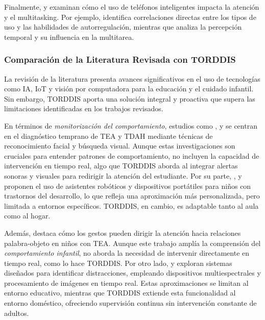 \documentclass[a4paper,fleqn]{cas-sc}
\begin{document}
	Finalmente, \cite{Hartley2022Smartphone} y \cite{Labar2019Interplay} examinan cómo el uso de teléfonos inteligentes impacta la atención y el multitasking. Por ejemplo, \cite{Hartley2022Smartphone} identifica correlaciones directas entre los tipos de uso y las habilidades de autorregulación, mientras que \cite{Labar2019Interplay} analiza la percepción temporal y su influencia en la multitarea.
	
	\subsubsection{Comparación de la Literatura Revisada con TORDDIS}
	
	La revisión de la literatura presenta avances significativos en el uso de tecnologías como IA, IoT y visión por computadora para la educación y el cuidado infantil. Sin embargo, TORDDIS aporta una solución integral y proactiva que supera las limitaciones identificadas en los trabajos revisados.
	
	En términos de \textit{monitorización del comportamiento}, estudios como \cite{Akter2021}, \cite{Pelc2006} y \cite{Albrecht2014} se centran en el diagnóstico temprano de TEA y TDAH mediante técnicas de reconocimiento facial y búsqueda visual. Aunque estas investigaciones son cruciales para entender patrones de comportamiento, no incluyen la capacidad de intervención en tiempo real, algo que TORDDIS aborda al integrar alertas sonoras y visuales para redirigir la atención del estudiante. Por su parte, \cite{Berrezueta-Guzman2021}, \cite{Warren2015Brief} y \cite{Washington2016AWereable} proponen el uso de asistentes robóticos y dispositivos portátiles para niños con trastornos del desarrollo, lo que refleja una aproximación más personalizada, pero limitada a entornos específicos. TORDDIS, en cambio, es adaptable tanto al aula como al hogar.
	
	Además, \cite{VilliersRader2021} destaca cómo los gestos pueden dirigir la atención hacia relaciones palabra-objeto en niños con TEA. Aunque este trabajo amplía la comprensión del \textit{comportamiento infantil}, no aborda la necesidad de intervenir directamente en tiempo real, como lo hace TORDDIS. Por otro lado, \cite{Campbell2015Using} y \cite{Ucar2022Recognizing} exploran sistemas diseñados para identificar distracciones, empleando dispositivos multiespectrales y procesamiento de imágenes en tiempo real. Estas aproximaciones se limitan al entorno educativo, mientras que TORDDIS extiende esta funcionalidad al entorno doméstico, ofreciendo supervisión continua sin intervención constante de adultos.
	
\end{document}
